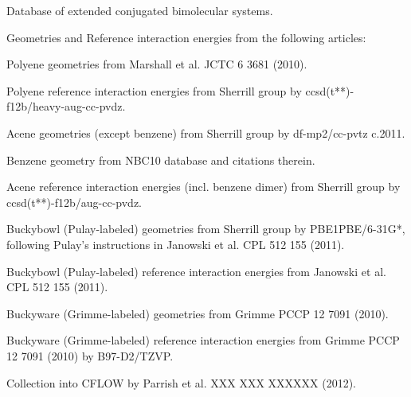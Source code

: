 \documentclass[letterpaper,10pt,english]{sphinxmanual}
\begin{document}
\begin{DUlineblock}{0em}
\item[] Database of extended conjugated bimolecular systems.
\item[] Geometries and Reference interaction energies from the following articles:
\item[]
\begin{DUlineblock}{\DUlineblockindent}
\item[] Polyene geometries from Marshall et al. JCTC 6 3681 (2010).
\item[] Polyene reference interaction energies from Sherrill group by ccsd(t**)-f12b/heavy-aug-cc-pvdz.
\item[] Acene geometries (except benzene) from Sherrill group by df-mp2/cc-pvtz c.2011.
\item[] Benzene geometry from NBC10 database and citations therein.
\item[] Acene reference interaction energies (incl. benzene dimer) from Sherrill group by ccsd(t**)-f12b/aug-cc-pvdz.
\item[] Buckybowl (Pulay-labeled) geometries from Sherrill group by PBE1PBE/6-31G*, following Pulay's instructions in Janowski et al. CPL 512 155 (2011).
\item[] Buckybowl (Pulay-labeled) reference interaction energies from Janowski et al. CPL 512 155 (2011).
\item[] Buckyware (Grimme-labeled) geometries from Grimme PCCP 12 7091 (2010).
\item[] Buckyware (Grimme-labeled) reference interaction energies from Grimme PCCP 12 7091 (2010) by B97-D2/TZVP.
\item[] Collection into CFLOW by Parrish et al. XXX XXX XXXXXX (2012).
\end{DUlineblock}
\end{DUlineblock}
\end{document}
